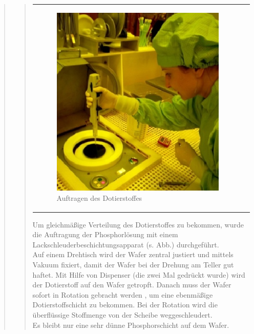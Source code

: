 \begin{quote}
\begin{quote}
\begin{center}
\begin{tabular}{ll}
\begin{minipage}{0.6\textwidth}
                        \begin{figure}[H]
                        \hspace{3.5em}
                            \includegraphics[scale=0.7, trim = 0cm 0cm 0cm
                            0cm, clip]{./HerstellungBilder/Dotierstoffauftragen.png}
                            \caption{Auftragen des Dotierstoffes}
                           \label{fig:aufDot}
                        \end{figure}
                    \vspace{-1.5em}

                    \end{minipage}

                \end{tabular}
		\end{center}
    
    	\vspace{2em}
    
		Um gleichmäßige Verteilung des Dotierstoffes zu bekommen, wurde die 
		Auftragung der Phosphorlösung mit einem 
		Lackschleuderbeschichtungsapparat (s. Abb.) durchgeführt.\\
 		Auf einem Drehtisch wird der Wafer zentral justiert und mittels Vakuum
 		fixiert, damit der Wafer bei der Drehung am Teller gut haftet. Mit Hilfe 
 		von Dispenser (die zwei	Mal gedrückt wurde) wird der Dotierstoff auf den
 		Wafer getropft. Danach muss der Wafer sofort in Rotation gebracht werden
 		, um eine ebenmäßige Dotierstoffschicht zu bekommen. Bei der Rotation 
 		wird die überflüssige Stoffmenge von der Scheibe weggeschleudert.\\
		Es bleibt nur eine sehr dünne Phosphorschicht auf dem Wafer.\\


\end{quote}
\end{quote}
